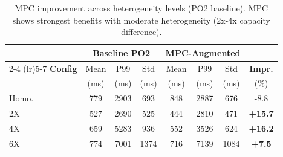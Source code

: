 
\begin{table}[t]
\caption{MPC improvement across heterogeneity levels (PO2 baseline). MPC shows strongest benefits with moderate heterogeneity (2x-4x capacity difference).}
\label{tab:mpc_results}
\centering
\small
\setlength{\tabcolsep}{4pt}
\begin{tabular}{l ccc ccc c}
\toprule
& \multicolumn{3}{c}{\textbf{Baseline PO2}} & \multicolumn{3}{c}{\textbf{MPC-Augmented}} & \\
\cmidrule(lr){2-4} \cmidrule(lr){5-7}
\textbf{Config} & Mean & P99 & Std & Mean & P99 & Std & \textbf{Impr.} \\
& (ms) & (ms) & (ms) & (ms) & (ms) & (ms) & (\%) \\
\midrule
Homo. & 779 & 2903 & 693 & 848 & 2887 & 676 & -8.8 \\
2X & 527 & 2690 & 525 & 444 & 2810 & 471 & \textbf{+15.7} \\
4X & 659 & 5283 & 936 & 552 & 3526 & 624 & \textbf{+16.2} \\
6X & 774 & 7001 & 1374 & 716 & 7139 & 1084 & \textbf{+7.5} \\

\bottomrule
\end{tabular}
\end{table}
